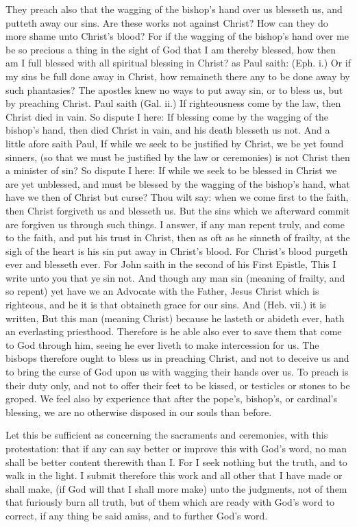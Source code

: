 They preach also that the wagging of the bishop's hand 
over us blesseth us, and putteth away our sins. Are these 
works not against Christ? How can they do more shame 
unto Christ's blood? For if the wagging of the bishop's 
hand over me be so precious a thing in the sight of God 
that I am thereby blessed, how then am I full blessed with 
all spiritual blessing in Christ? as Paul saith: (Eph. i.) 
Or if my sins be full done away in Christ, how remaineth 
there any to be done away by such phantasies? The 
apostles knew no ways to put away sin, or to bless us, but by 
preaching Christ. Paul saith (Gal. ii.) If righteousness 
come by the law, then Christ died in vain. So dispute I 
here: If blessing come by the wagging of the bishop's 
hand, then died Christ in vain, and his death blesseth us 
not. And a little afore saith Paul, If while we seek to be 
justified by Christ, we be yet found sinners, (so that we 
must be justified by the law or ceremonies) is not Christ 
then a minister of sin? So dispute I here: If while we 
seek to be blessed in Christ we are yet unblessed, and 
must be blessed by the wagging of the bishop's hand, what 
have we then of Christ but curse? Thou wilt say: when we 
come first to the faith, then Christ forgiveth us and 
blesseth us. But the sins which we afterward commit are 
forgiven us through such things. I answer, if any man 
repent truly, and come to the faith, and put his trust in 
Christ, then as oft as he sinneth of frailty, at the sigh of the 
heart is his sin put away in Christ's blood. For Christ's 
blood purgeth ever and blesseth ever. For John saith in 
the second of his First Epistle, This I write unto you that 
ye sin not. And though any man sin (meaning of frailty, 
and so repent) yet have we an Advocate with the Father, 
Jesus Christ which is righteous, and he it is that obtaineth 
grace for our sins. And (Heb. vii.) it is written, But this 
man (meaning Christ) because he lasteth or abideth ever, 
hath an everlasting priesthood. Therefore is he able also 
ever to save them that come to God through him, seeing 
he ever liveth to make intercession for us. The bisbops 
therefore ought to bless us in preaching Christ, and not 
to deceive us and to bring the curse of God upon us with 
wagging their hands over us. To preach is their duty 
only, and not to offer their feet to be kissed, or testicles or 
stones to be groped. We feel also by experience that 
after the pope's, bishop's, or cardinal's blessing, we are 
no otherwise disposed in our souls than before. 

Let this be sufficient as concerning the sacraments and
ceremonies, with this protestation: that if any can say 
better or improve this with God's word, no man shall be 
better content therewith than I. For I seek nothing but 
the truth, and to walk in the light. I submit therefore this 
work and all other that I have made or shall make, (if 
God will that I shall more make) unto the judgments, 
not of them that furiously burn all truth, but of them 
which are ready with God's word to correct, if any thing 
be said amiss, and to further God's word. 

